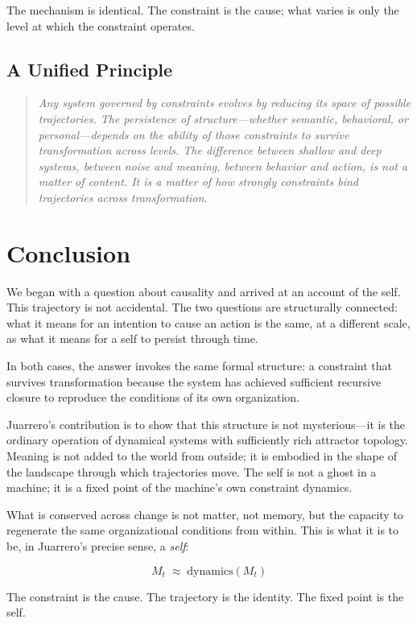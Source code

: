 \documentclass[11pt]{article}
\begin{document}
The mechanism is identical. The constraint is the cause; what varies is only the level
at which the constraint operates.

\subsection{A Unified Principle}

\begin{quote}
\itshape
Any system governed by constraints evolves by reducing its space of possible trajectories.
The persistence of structure—whether semantic, behavioral, or personal—depends on the
ability of those constraints to survive transformation across levels. The difference
between shallow and deep systems, between noise and meaning, between behavior and action,
is not a matter of content. It is a matter of how strongly constraints bind trajectories
across transformation.
\end{quote}

\section{Conclusion}

We began with a question about causality and arrived at an account of the self. This
trajectory is not accidental. The two questions are structurally connected: what it means
for an intention to cause an action is the same, at a different scale, as what it means
for a self to persist through time.

In both cases, the answer invokes the same formal structure: a constraint that survives
transformation because the system has achieved sufficient recursive closure to reproduce
the conditions of its own organization.

Juarrero's contribution is to show that this structure is not mysterious—it is the
ordinary operation of dynamical systems with sufficiently rich attractor topology. Meaning
is not added to the world from outside; it is embodied in the shape of the landscape
through which trajectories move. The self is not a ghost in a machine; it is a fixed
point of the machine's own constraint dynamics.

What is conserved across change is not matter, not memory, but the capacity to regenerate
the same organizational conditions from within. This is what it is to be, in Juarrero's
precise sense, a \emph{self}:

\[
\boxed{M_t \;\approx\; \mathrm{dynamics}(M_t)}
\]

The constraint is the cause. The trajectory is the identity. The fixed point is the self.
\end{document}
